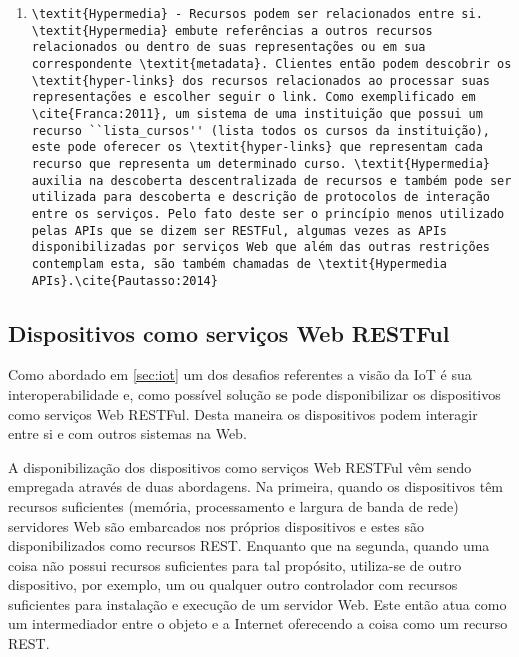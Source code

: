 \begin{enumerate}
\item \begin{verbatim}\textit{Hypermedia} - Recursos podem ser relacionados entre si. \textit{Hypermedia} embute referências a outros recursos relacionados ou dentro de suas representações ou em sua correspondente \textit{metadata}. Clientes então podem descobrir os \textit{hyper-links} dos recursos relacionados ao processar suas representações e escolher seguir o link. Como exemplificado em \cite{Franca:2011}, um sistema de uma instituição que possui um recurso ``lista_cursos'' (lista todos os cursos da instituição), este pode oferecer os \textit{hyper-links} que representam cada recurso que representa um determinado curso. \textit{Hypermedia} auxilia na descoberta descentralizada de recursos e também pode ser utilizada para descoberta e descrição de protocolos de interação entre os serviços. Pelo fato deste ser o princípio menos utilizado pelas APIs que se dizem ser RESTFul, algumas vezes as APIs disponibilizadas por serviços Web que além das outras restrições contemplam esta, são também chamadas de \textit{Hypermedia APIs}.\cite{Pautasso:2014}\end{verbatim}
\end{enumerate}

\subsection{Dispositivos como serviços Web RESTFul} 
\label{subsec:dispositivosWeb}
Como abordado em \ref{sec:iot} um dos desafios referentes a visão da IoT é sua interoperabilidade e, como possível solução se pode disponibilizar os dispositivos como serviços Web RESTFul. Desta maneira os dispositivos podem interagir entre si e com outros sistemas na Web.

A disponibilização dos dispositivos como serviços Web RESTFul vêm sendo empregada através de duas abordagens. Na primeira, quando os dispositivos têm recursos suficientes (memória, processamento e largura de banda de rede) servidores Web são embarcados nos próprios dispositivos e estes são disponibilizados como recursos REST. Enquanto que na segunda, quando uma coisa não possui recursos suficientes para tal propósito, utiliza-se de outro dispositivo, por exemplo, um \footnotetext{**} ou qualquer outro controlador com recursos suficientes para instalação e execução de um servidor Web. Este então atua como um intermediador entre o objeto e a Internet oferecendo a coisa como um recurso REST.\cite{Franca:2011}

